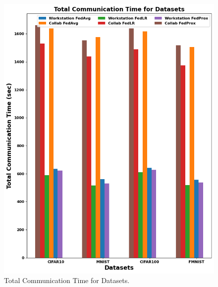 \documentclass[conference]{IEEEtran}
\begin{document}
\begin{figure}[htp!]
	\centering
	\includegraphics[scale=.4]{Images/Result Images/FinalGraphwithFedprox }
	\caption{Total Communication Time for Datasets.}
	\label{Finalgraph}
\end{figure}
\end{document}
